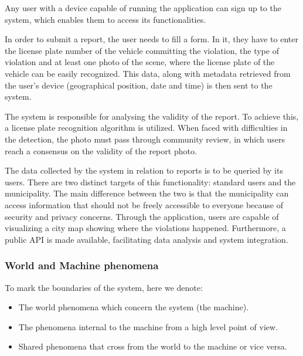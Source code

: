 Any user with a device capable of running the application can sign up to the system, which enables them to access its functionalities.

In order to submit a report, the user needs to fill a form. In it, they have to enter the license plate number of the vehicle committing the violation, the type of violation and at least one photo of the scene, where the license plate of the vehicle can be easily recognized. This data, along with metadata retrieved from the user's device (geographical position, date and time) is then sent to the system.

The system is responsible for analysing the validity of the report. To achieve this, a license plate recognition algorithm is utilized. When faced with difficulties in the detection, the photo must pass through community review, in which users reach a consensus on the validity of the report photo.

The data collected by the system in relation to reports is to be queried by its users. There are two distinct targets of this functionality: standard users and the municipality. The main difference between the two is that the municipality can access information that should not be freely accessible to everyone because of security and privacy concerns. Through the application, users are capable of visualizing a city map showing where the violations happened. Furthermore, a public API is made available, facilitating data analysis and system integration.

\subsubsection{World and Machine phenomena}
To mark the boundaries of the system, here we denote:
    \begin{itemize}
        \item The world phenomena which concern the system (the machine).
        \item The phenomena internal to the machine from a high level point of view.
        \item Shared phenomena that cross from the world to the machine or vice versa.
    \end{itemize}


